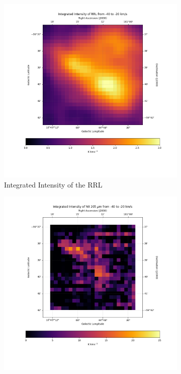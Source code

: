 \begin{figure}
    \centering
    \begin{subfigure}[t]{0.49\textwidth}
        \centering
        \includegraphics[width=\textwidth]{figs/carina/keyhole/rrl.png}
        \caption{Integrated Intensity of the RRL}
    \end{subfigure}
    \begin{subfigure}[t]{0.49\textwidth}
        \centering
        \includegraphics[width=\textwidth]{figs/carina/keyhole/205.png}

\end{subfigure}
\end{figure}
